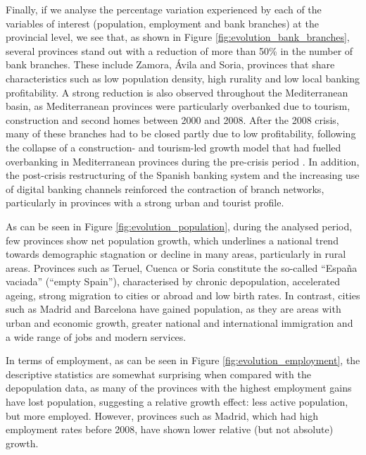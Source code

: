 \documentclass[a4paper,11pt,oneside]{article}
\begin{document}
Finally, if we analyse the percentage variation experienced by each of the variables of interest (population, employment and bank branches) at the provincial level, we see that, as shown in Figure \ref{fig:evolution_bank_branches}, several provinces stand out with a reduction of more than 50\% in the number of bank branches. These include Zamora, Ávila and Soria, provinces that share characteristics such as low population density, high rurality and low local banking profitability. A strong reduction is also observed throughout the Mediterranean basin, as Mediterranean provinces were particularly overbanked due to tourism, construction and second homes between 2000 and 2008. After the 2008 crisis, many of these branches had to be closed partly due to low profitability, following the collapse of a construction- and tourism-led growth model that had fuelled overbanking in Mediterranean provinces during the pre-crisis period \citep{garcia2007algunas,maudos2017bank}. In addition, the post-crisis restructuring of the Spanish banking system and the increasing use of digital banking channels reinforced the contraction of branch networks, particularly in provinces with a strong urban and tourist profile.




As can be seen in Figure \ref{fig:evolution_population}, during the analysed period, few provinces show net population growth, which underlines a national trend towards demographic stagnation or decline in many areas, particularly in rural areas. Provinces such as Teruel, Cuenca or Soria constitute the so-called ``España vaciada'' (``empty Spain''), characterised by chronic depopulation, accelerated ageing, strong migration to cities or abroad and low birth rates. In contrast, cities such as Madrid and Barcelona have gained population, as they are areas with urban and economic growth, greater national and international immigration and a wide range of jobs and modern services.




In terms of employment, as can be seen in Figure \ref{fig:evolution_employment}, the descriptive statistics are somewhat surprising when compared with the depopulation data, as many of the provinces with the highest employment gains have lost population, suggesting a relative growth effect: less active population, but more employed. However, provinces such as Madrid, which had high employment rates before 2008, have shown lower relative (but not absolute) growth.
\end{document}
